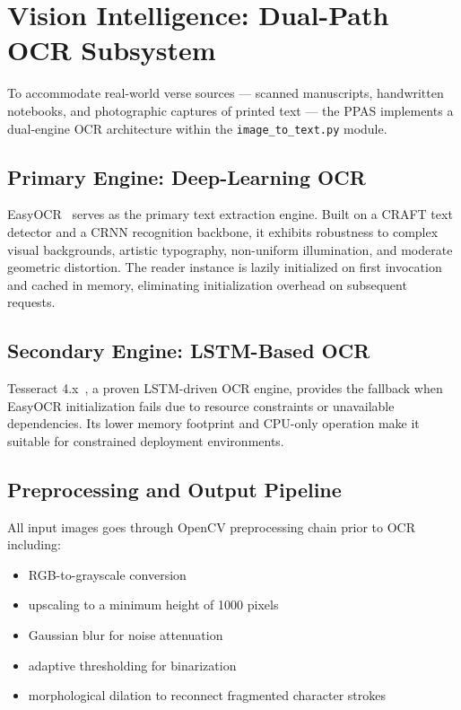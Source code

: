 \documentclass[conference]{IEEEtran}
\begin{document}
\section{Vision Intelligence: Dual-Path OCR Subsystem}
\label{sec:ocr}

To accommodate real-world verse sources --- scanned manuscripts,
handwritten notebooks, and photographic captures of printed text --- the
PPAS implements a dual-engine OCR architecture within the
\texttt{image\_to\_text.py} module.

\subsection{Primary Engine: Deep-Learning OCR}

EasyOCR~\cite{baek2019} serves as the primary text extraction engine.
Built on a CRAFT text detector and a CRNN recognition backbone, it
exhibits robustness to complex visual backgrounds, artistic typography,
non-uniform illumination, and moderate geometric distortion. The reader
instance is lazily initialized on first invocation and cached in memory,
eliminating initialization overhead on subsequent requests.

\subsection{Secondary Engine: LSTM-Based OCR}

Tesseract 4.x~\cite{smith2007}, a proven LSTM-driven OCR engine, provides
the fallback when EasyOCR initialization fails due to resource
constraints or unavailable dependencies. Its lower memory footprint and
CPU-only operation make it suitable for constrained deployment
environments.

\subsection{Preprocessing and Output Pipeline}

All input images goes through OpenCV preprocessing chain prior to OCR including:
\begin{itemize}
    \item RGB-to-grayscale conversion
    \item upscaling to a minimum height of 1000 pixels
    \item Gaussian blur for noise attenuation
    \item adaptive thresholding for binarization
    \item morphological dilation to reconnect fragmented character strokes
\end{itemize}
\end{document}
